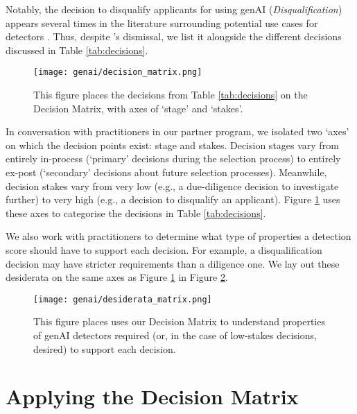 Notably, the decision to disqualify applicants for using genAI (\emph{Disqualification}) appears several times in the literature surrounding potential use cases for detectors \cite{gptzero_gptzero_2023,kalpesh_krishna_paraphrasing_2023}. Thus, despite \rise's dismissal, we list it alongside the different decisions discussed in Table \ref{tab:decisions}.

\begin{figure}[htbp]
  \centering
  \texttt{[image: genai/decision\_matrix.png]}
  \caption{This figure places the decisions from Table \ref{tab:decisions} on the Decision Matrix, with axes of `stage' and `stakes'.}
  \label{fig:decision_matrix}
\end{figure}

In conversation with practitioners in our partner program, we isolated two `axes' on which the decision points exist: stage and stakes. Decision stages vary from entirely in-process (`primary' decisions during the selection process) to entirely ex-post (`secondary' decisions about future selection processes). Meanwhile, decision stakes vary from very low (e.g., a due-diligence decision to investigate further) to very high (e.g., a decision to disqualify an applicant). Figure \ref{fig:decision_matrix} uses these axes to categorise the decisions in Table \ref{tab:decisions}.

We also work with practitioners to determine what type of properties a detection score should have to support each decision. For example, a disqualification decision may have stricter requirements than a diligence one. We lay out these desiderata on the same axes as Figure \ref{fig:decision_matrix} in Figure \ref{fig:desiderata_matrix}. 

\begin{figure}[htbp]
  \centering
  \texttt{[image: genai/desiderata\_matrix.png]}
  \caption{This figure places uses our Decision Matrix to understand properties of genAI detectors required (or, in the case of low-stakes decisions, desired) to support each decision.}
  \label{fig:desiderata_matrix}
\end{figure}

\section{Applying the Decision Matrix}\label{sec:data}
